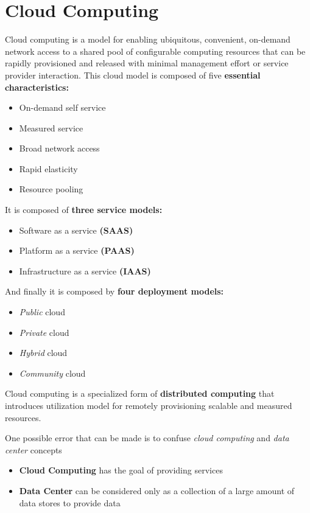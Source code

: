 \chapter{Cloud Computing}
Cloud computing is a model for enabling ubiquitous, convenient, on-demand network access to a shared pool of configurable computing resources that can be rapidly provisioned and released with minimal management effort or service provider interaction.
This cloud model is composed of five \textbf{essential characteristics:}
\begin{itemize}
    \item On-demand self service
    \item Measured service
    \item Broad network access
    \item Rapid elasticity
    \item Resource pooling
\end{itemize}
It is composed of \textbf{three service models:}
\begin{itemize}
    \item  Software as a service \textbf{(SAAS)}
    \item Platform as a service \textbf{(PAAS)}
    \item Infrastructure as a service \textbf{(IAAS)}
\end{itemize}
And finally it is composed by \textbf{four deployment models:}
\begin{itemize}
    \item \textit{Public} cloud
    \item \textit{Private} cloud
    \item \textit{Hybrid} cloud
    \item \textit{Community} cloud
\end{itemize}

Cloud computing is a specialized form of \textbf{distributed computing} that introduces utilization model for remotely provisioning scalable and measured resources.

One possible error that can be made is to confuse \textit{cloud computing} and \textit{data center} concepts
\begin{itemize}
    \item \textbf{Cloud Computing} has the goal of providing services
    \item \textbf{Data Center} can be considered only as a collection of a large amount of data stores to provide data
\end{itemize}

